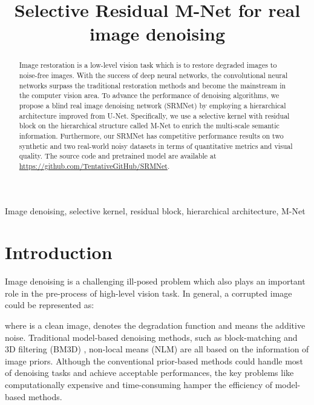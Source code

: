 \documentclass{article}
\begin{document}
\sloppy

\def\x{{\mathbf x}}
\def\L{{\cal L}}

\title{Selective Residual M-Net for real image denoising}


\address{
\ninept Department of Electrical Engineering and Graduate Institute of Communication Engineering, National Chung Hsing University, Taiwan
\\
\ninept Department of Computer Science and Information Engineering, National Taichung University of Science and Technology, Taiwan
}

\maketitle

\begin{abstract}
Image restoration is a low-level vision task which is to restore degraded images to noise-free images. With the success of deep neural networks, the convolutional neural networks surpass the traditional restoration methods and become the mainstream in the computer vision area. To advance the performance of denoising algorithms, we propose a blind real image denoising network (SRMNet) by employing a hierarchical architecture improved from U-Net. Specifically, we use a selective kernel with residual block on the hierarchical structure called M-Net to enrich the multi-scale semantic information. Furthermore, our SRMNet has competitive performance results on two synthetic and two real-world noisy datasets in terms of quantitative metrics and visual quality. The source code and pretrained model are available at \url{https://github.com/TentativeGitHub/SRMNet}.
\end{abstract}
\begin{keywords}
Image denoising, selective kernel, residual block, hierarchical architecture, M-Net
\end{keywords}
\section{Introduction}

Image denoising is a challenging ill-posed problem which also plays an important role in the pre-process of high-level vision task. In general, a corrupted image  could be represented as: 

where  is a clean image,  denotes the degradation function and  means the additive noise. Traditional model-based denoising methods, such as block-matching and 3D filtering (BM3D) \cite{01}, non-local means (NLM) \cite{02} are all based on the information of image priors. Although the conventional prior-based methods could handle most of denoising tasks and achieve acceptable performances, the key problems like computationally expensive and time-consuming hamper the efficiency of model-based methods. 
\end{document}
